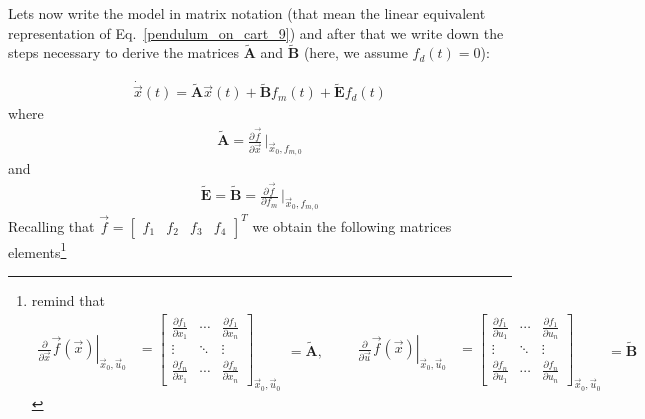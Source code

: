 \documentclass[11pt,a4paper,oneside]{book}
\numberwithin{equation}{section}
\theoremstyle{it}
\theoremstyle{definition}
\begin{document}
Lets now write the model in matrix notation (that mean the linear equivalent representation  of Eq.~\eqref{pendulum_on_cart_9}) and after that we write down the steps necessary to derive the matrices $\tilde{\mathbf{A}}$ and $\tilde{\mathbf{B}}$ (here, we assume $f_{d}(t)=0$):


\begin{equation}\label{pendulum_on_cart_11}
	\begin{aligned}
		\dot{\vec{x}}(t)=\tilde{\mathbf{A}}\vec{x}(t)+\tilde{\mathbf{B}}f_m(t)+\tilde{\mathbf{E}}f_d(t)
	\end{aligned}
\end{equation}
where
\begin{equation}\label{pendulum_on_cart_12}
	\begin{aligned}
		\tilde{\mathbf{A}}=\frac{\partial\vec{f}}{\partial\vec{x}}\,\Big|_{\vec{x}_0,f_{m,0}}
	\end{aligned}
\end{equation}
and
\begin{equation}\label{pendulum_on_cart_13}
	\begin{aligned}
		\tilde{\mathbf{E}}=\tilde{\mathbf{B}}=\frac{\partial\vec{f}}{\partial f_m}\,\Big|_{\vec{x}_0,f_{m,0}}
	\end{aligned}
\end{equation}
Recalling that $\vec{f}=\begin{bmatrix} f_1&f_2&f_3&f_4\end{bmatrix}^T$ we 
obtain the following matrices elements\footnote{remind that \begin{equation*}
		\begin{aligned}
			\left.\frac{\partial}{\partial 
				\vec{x}}\vec{f}(\vec{x})\right|_{\vec{x}_0,\vec{u}_0} &= 
			\begin{bmatrix} \frac{\partial f_1}{\partial x_1} & \cdots & 
				\frac{\partial f_1}{\partial x_n} \\[6pt]
				\vdots & \ddots & \vdots \\[6pt]
				\frac{\partial f_n}{\partial x_1} & \cdots & \frac{\partial 
					f_n}{\partial x_n}
			\end{bmatrix}_{\vec{x}_0,\vec{u}_0}
		\end{aligned}=\tilde{\mathbf{A}},\qquad
		\begin{aligned}
			\left.\frac{\partial}{\partial 
				\vec{u}}\vec{f}(\vec{x})\right|_{\vec{x}_0,\vec{u}_0} &= 
			\begin{bmatrix} \frac{\partial f_1}{\partial u_1} & \cdots & 
				\frac{\partial f_1}{\partial u_n} \\[6pt]
				\vdots & \ddots & \vdots \\[6pt]
				\frac{\partial f_n}{\partial u_1} & \cdots & \frac{\partial 
					f_n}{\partial u_n}
			\end{bmatrix}_{\vec{x}_0,\vec{u}_0}
		\end{aligned}=\tilde{\mathbf{B}}
\end{equation*} }
\end{document}
